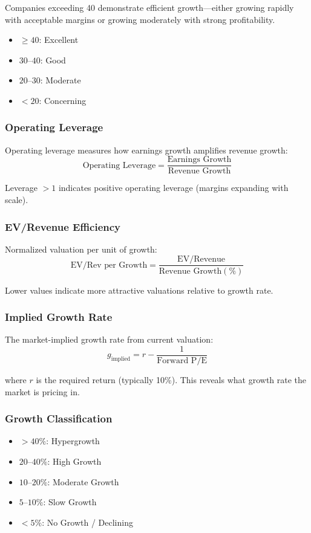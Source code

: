 Companies exceeding 40 demonstrate efficient growth---either growing rapidly with acceptable margins or growing moderately with strong profitability.

\begin{itemize}
  \item[] $\geq 40$: Excellent
  \item[] $30$--$40$: Good
  \item[] $20$--$30$: Moderate
  \item[] $< 20$: Concerning
\end{itemize}

\subsubsection{Operating Leverage}

Operating leverage measures how earnings growth amplifies revenue growth:
\[
\text{Operating Leverage} = \frac{\text{Earnings Growth}}{\text{Revenue Growth}}
\]

Leverage $> 1$ indicates positive operating leverage (margins expanding with scale).

\subsubsection{EV/Revenue Efficiency}

Normalized valuation per unit of growth:
\[
\text{EV/Rev per Growth} = \frac{\text{EV/Revenue}}{\text{Revenue Growth}(\%)}
\]

Lower values indicate more attractive valuations relative to growth rate.

\subsubsection{Implied Growth Rate}

The market-implied growth rate from current valuation:
\[
g_{\text{implied}} = r - \frac{1}{\text{Forward P/E}}
\]

where $r$ is the required return (typically 10\%). This reveals what growth rate the market is pricing in.

\subsubsection{Growth Classification}

\begin{itemize}
  \item[] $> 40\%$: Hypergrowth
  \item[] $20$--$40\%$: High Growth
  \item[] $10$--$20\%$: Moderate Growth
  \item[] $5$--$10\%$: Slow Growth
  \item[] $< 5\%$: No Growth / Declining
\end{itemize}

